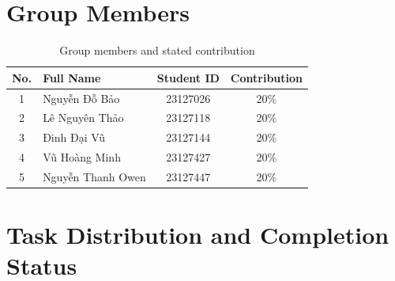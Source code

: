 \section*{Group Members}

\begin{table}[H]
\centering
\renewcommand{\arraystretch}{1.4}
\begin{tabularx}{\textwidth}{|c|X|c|c|}
\hline
\textbf{No.} & \textbf{Full Name} & \textbf{Student ID} & \textbf{Contribution} \\ \hline
1 & Nguyễn Đỗ Bảo & 23127026 & 20\% \\ \hline
2 & Lê Nguyên Thảo & 23127118 & 20\% \\ \hline
3 & Đinh Đại Vũ & 23127144 & 20\% \\ \hline
4 & Vũ Hoàng Minh & 23127427 & 20\% \\ \hline
5 & Nguyễn Thanh Owen & 23127447 & 20\% \\ \hline
\end{tabularx}
\caption{Group members and stated contribution}
\label{tab:group-members}
\end{table}

\section*{Task Distribution and Completion Status}

